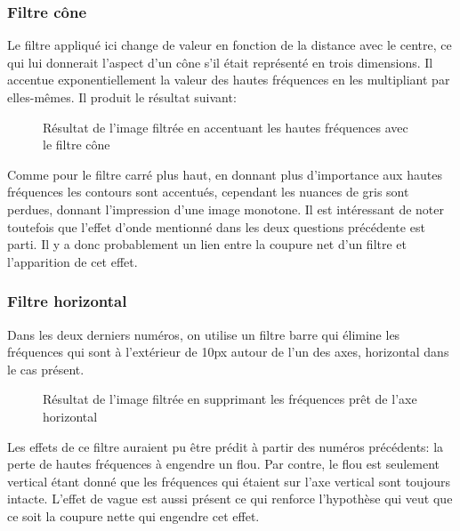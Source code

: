 \documentclass[12pt]{article}
\begin{document}
\subsubsection{Filtre cône}
Le filtre appliqué ici change de valeur en fonction de la distance avec le centre, ce qui lui donnerait l'aspect d'un cône s'il était représenté en trois dimensions. Il accentue exponentiellement la valeur des hautes fréquences en les multipliant par elles-mêmes. Il produit le résultat suivant:
\begin{figure}[ht]
  \centering
  \captionsetup{width=.8\linewidth}
  \caption{Résultat de l'image filtrée en accentuant les hautes fréquences avec le filtre cône}
\end{figure}
Comme pour le filtre carré plus haut, en donnant plus d'importance aux hautes fréquences les contours sont accentués, cependant les nuances de gris sont perdues, donnant l'impression d'une image monotone. Il est intéressant de noter toutefois que l'effet d'onde mentionné dans les deux questions précédente est parti. Il y a donc probablement un lien entre la coupure net d'un filtre et l'apparition de cet effet. 

\subsubsection{Filtre horizontal}
Dans les deux derniers numéros, on utilise un filtre barre qui élimine les fréquences qui sont à l'extérieur de 10px autour de l'un des axes, horizontal dans le cas présent.
\begin{figure}[ht]
  \centering
  \captionsetup{width=.8\linewidth}
  \caption{Résultat de l'image filtrée en supprimant les fréquences prêt de l'axe horizontal}
\end{figure}
Les effets de ce filtre auraient pu être prédit à partir des numéros précédents: la perte de hautes fréquences à engendre un flou. Par contre, le flou est seulement vertical étant donné que les fréquences qui étaient sur l'axe vertical sont toujours intacte. L'effet de vague est aussi présent ce qui renforce l'hypothèse qui veut que ce soit la coupure nette qui engendre cet effet.
\end{document}
